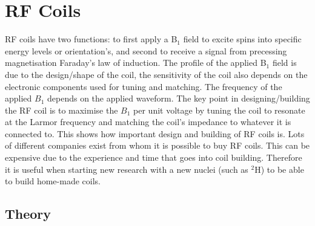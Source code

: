 
\section{RF Coils}

\ac{RF} coils have two functions: to first apply a B$_1$ field to excite spins into specific energy levels or orientation's, and second to receive a signal from precessing magnetisation Faraday's law of induction. The profile of the applied B$_1$ field is due to the design/shape of the coil, the sensitivity of the coil also depends on the electronic components used for tuning and matching. The frequency of the applied $B_1$ depends on the applied waveform. The key point in designing/building the \ac{RF} coil is to maximise the $B_1$ per unit voltage by tuning the coil to resonate at the Larmor frequency and matching the coil's impedance to whatever it is connected to. This shows how important design and building of \ac{RF} coils is. Lots of different companies exist from whom it is possible to buy \ac{RF} coils. This can be expensive due to the experience and time that goes into coil building. Therefore it is useful when starting new research with a new nuclei (such as $^2$H) to be able to build home-made coils. 

\subsection{Theory}




